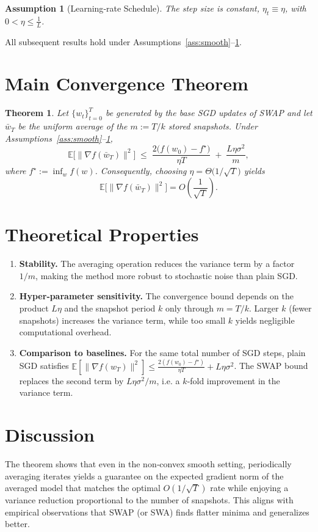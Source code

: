 \documentclass{article}
\newtheorem{theorem}{Theorem}
\newtheorem{assumption}{Assumption}
\newcommand{\E}{\mathbb{E}}
\begin{document}
\begin{assumption}[Learning‑rate Schedule]
\label{ass:lr}
The step size is constant, $\eta_t\equiv\eta$, with $0<\eta\le\frac{1}{L}$.
\end{assumption}

All subsequent results hold under Assumptions~\ref{ass:smooth}–\ref{ass:lr}.

\section*{Main Convergence Theorem}
\begin{theorem}
\label{thm:main}
Let $\{w_t\}_{t=0}^{T}$ be generated by the base SGD updates of SWAP and let $\bar w_T$ be the uniform average of the $m:=T/k$ stored snapshots. Under Assumptions~\ref{ass:smooth}–\ref{ass:lr},
\[
    \E\bigl[\|\nabla f(\bar w_T)\|^2\bigr]
    \;\le\;
    \frac{2\bigl(f(w_0)-f^\star\bigr)}{\eta T}
    \;+\;
    \frac{L\eta\sigma^2}{m},
\]
where $f^\star:=\inf_{w} f(w)$. Consequently, choosing $\eta=\Theta\bigl(1/\sqrt{T}\bigr)$ yields
\[
    \E\bigl[\|\nabla f(\bar w_T)\|^2\bigr]=O\!\left(\frac{1}{\sqrt{T}}\right).
\]
\end{theorem}

\section*{Theoretical Properties}
\begin{enumerate}[leftmargin=*]
    \item \textbf{Stability.} The averaging operation reduces the variance term by a factor $1/m$, making the method more robust to stochastic noise than plain SGD.
    \item \textbf{Hyper‑parameter sensitivity.} The convergence bound depends on the product $L\eta$ and the snapshot period $k$ only through $m=T/k$. Larger $k$ (fewer snapshots) increases the variance term, while too small $k$ yields negligible computational overhead.
    \item \textbf{Comparison to baselines.} For the same total number of SGD steps, plain SGD satisfies 
    $\E[\|\nabla f(w_T)\|^2]\le \frac{2(f(w_0)-f^\star)}{\eta T}+L\eta\sigma^2$.
    The SWAP bound replaces the second term by $L\eta\sigma^2/m$, i.e. a $k$‑fold improvement in the variance term.
\end{enumerate}

\section*{Discussion}
The theorem shows that even in the non‑convex smooth setting, periodically averaging iterates yields a guarantee on the expected gradient norm of the averaged model that matches the optimal $O(1/\sqrt{T})$ rate while enjoying a variance reduction proportional to the number of snapshots. This aligns with empirical observations that SWAP (or SWA) finds flatter minima and generalizes better.
\end{document}
